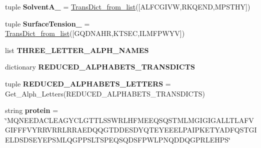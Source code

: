 \begin{DoxyCompactItemize}
\item 
\hypertarget{namespacefeat__extract_1_1_a_alphabets_adb78fc1df429906552b76b254e22f44d}{}tuple {\bfseries Solvent\+A\+\_} = \hyperlink{namespacefeat__extract_1_1_a_alphabets_acdda8523b57175e0e79064c4da723c5d}{Trans\+Dict\+\_\+from\+\_\+list}(\mbox{[}\textquotesingle{}A\+L\+F\+C\+G\+I\+V\+W\textquotesingle{},\textquotesingle{}R\+K\+Q\+E\+N\+D\textquotesingle{},\textquotesingle{}M\+P\+S\+T\+H\+Y\textquotesingle{}\mbox{]})\label{namespacefeat__extract_1_1_a_alphabets_adb78fc1df429906552b76b254e22f44d}

\item 
\hypertarget{namespacefeat__extract_1_1_a_alphabets_a06d2765369b3d2396c98f652aaf05035}{}tuple {\bfseries Surface\+Tension\+\_} = \hyperlink{namespacefeat__extract_1_1_a_alphabets_acdda8523b57175e0e79064c4da723c5d}{Trans\+Dict\+\_\+from\+\_\+list}(\mbox{[}\textquotesingle{}G\+Q\+D\+N\+A\+H\+R\textquotesingle{},\textquotesingle{}K\+T\+S\+E\+C\textquotesingle{},\textquotesingle{}I\+L\+M\+F\+P\+W\+Y\+V\textquotesingle{}\mbox{]})\label{namespacefeat__extract_1_1_a_alphabets_a06d2765369b3d2396c98f652aaf05035}

\item 
list {\bfseries T\+H\+R\+E\+E\+\_\+\+L\+E\+T\+T\+E\+R\+\_\+\+A\+L\+P\+H\+\_\+\+N\+A\+M\+E\+S}
\item 
dictionary {\bfseries R\+E\+D\+U\+C\+E\+D\+\_\+\+A\+L\+P\+H\+A\+B\+E\+T\+S\+\_\+\+T\+R\+A\+N\+S\+D\+I\+C\+T\+S}
\item 
\hypertarget{namespacefeat__extract_1_1_a_alphabets_af41275169c7f51c80c92ca4645a9ac42}{}tuple {\bfseries R\+E\+D\+U\+C\+E\+D\+\_\+\+A\+L\+P\+H\+A\+B\+E\+T\+S\+\_\+\+L\+E\+T\+T\+E\+R\+S} = Get\+\_\+\+Alph\+\_\+\+Letters(R\+E\+D\+U\+C\+E\+D\+\_\+\+A\+L\+P\+H\+A\+B\+E\+T\+S\+\_\+\+T\+R\+A\+N\+S\+D\+I\+C\+T\+S)\label{namespacefeat__extract_1_1_a_alphabets_af41275169c7f51c80c92ca4645a9ac42}

\item 
\hypertarget{namespacefeat__extract_1_1_a_alphabets_a6ed30c9ab1a985c6c9f2aab8c64704a4}{}string {\bfseries protein} = \char`\"{}M\+Q\+N\+E\+E\+D\+A\+C\+L\+E\+A\+G\+Y\+C\+L\+G\+T\+T\+L\+S\+S\+W\+R\+L\+H\+F\+M\+E\+E\+Q\+S\+Q\+S\+T\+M\+L\+M\+G\+I\+G\+I\+G\+A\+L\+L\+T\+L\+A\+F\+V\+G\+I\+F\+F\+F\+V\+Y\+R\+R\+V\+R\+R\+L\+R\+R\+A\+E\+D\+Q\+Q\+G\+T\+D\+D\+E\+S\+D\+Y\+Q\+T\+E\+Y\+E\+E\+E\+L\+P\+A\+I\+P\+K\+E\+T\+Y\+A\+D\+F\+Q\+S\+T\+G\+I\+E\+L\+D\+S\+D\+S\+E\+Y\+E\+P\+S\+M\+L\+Q\+G\+P\+P\+S\+L\+T\+S\+P\+E\+Q\+S\+Q\+D\+S\+F\+P\+W\+L\+P\+N\+Q\+D\+D\+Q\+G\+P\+R\+L\+E\+H\+P\+S\char`\"{}\label{namespacefeat__extract_1_1_a_alphabets_a6ed30c9ab1a985c6c9f2aab8c64704a4}

\end{DoxyCompactItemize}


